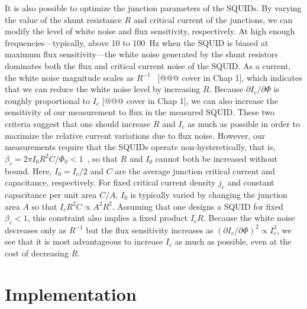 It is also possible to optimize the junction parameters of the SQUIDs. By varying the value of the shunt resistance $R$ and critical current of the junctions, we can modify the level of white noise and flux sensitivity, respectively. At high enough frequencies---typically, above 10 to 100~Hz when the SQUID is biased at maximum flux sensitivity---the white noise generated by the shunt resistors dominates both the flux and critical current noise of the SQUID. As a current, the white noise magnitude scales as $R^{-1}$~\citep{Likharev:1972} [@@@ cover in Chap 1], which indicates that we can reduce the white noise level by increasing $R$. Because $\partial I_c/\partial\Phi$ is roughly proportional to $I_c$ [@@@ cover in Chap 1], we can also increase the sensitivity of our measurement to flux in the measured SQUID. These two criteria suggest that one should increase $R$ and $I_c$ as much as possible in order to maximize the relative current variations due to flux noise. However, our measurements require that the SQUIDs operate non-hysteretically, that is, $\beta_c = 2\pi I_0 R^2 C/\Phi_0 < 1$~\citep{Stewart:1968,McCumber:1968}, so that $R$ and $I_0$ cannot both be increased without bound. Here, $I_0 = I_c/2$ and $C$ are the average junction critical current and capacitance, respectively. For fixed critical current density $j_c$ and constant capacitance per unit area $C/A$, $I_0$ is typically varied by changing the junction area $A$ so that $I_cR^2 C \propto A^2 R^2$. Assuming that one designs a SQUID for fixed $\beta_c < 1$, this constraint also implies a fixed product $I_c R$. Because the white noise decreases only as $R^{-1}$ but the flux sensitivity increases as $(\partial I_c/\partial\Phi)^2 \propto I_c^2$, we see that it is most advantageous to increase $I_c$ as much as possible, even at the cost of decreasing $R$.

\section{Implementation}

